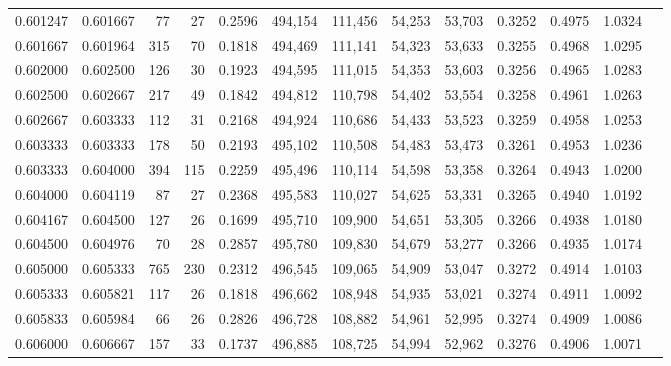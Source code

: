 \begin{tabular}{rrrrrrrrrrrrr}
0.601247 & 0.601667 &    77 &  27 &                                     0.2596 & 494,154 & 111,456 &  54,253 &  53,703 & 0.3252 & 0.4975 & 1.0324 \\
0.601667 & 0.601964 &   315 &  70 &                                     0.1818 & 494,469 & 111,141 &  54,323 &  53,633 & 0.3255 & 0.4968 & 1.0295 \\
0.602000 & 0.602500 &   126 &  30 &                                     0.1923 & 494,595 & 111,015 &  54,353 &  53,603 & 0.3256 & 0.4965 & 1.0283 \\
0.602500 & 0.602667 &   217 &  49 &                                     0.1842 & 494,812 & 110,798 &  54,402 &  53,554 & 0.3258 & 0.4961 & 1.0263 \\
0.602667 & 0.603333 &   112 &  31 &                                     0.2168 & 494,924 & 110,686 &  54,433 &  53,523 & 0.3259 & 0.4958 & 1.0253 \\
0.603333 & 0.603333 &   178 &  50 &                                     0.2193 & 495,102 & 110,508 &  54,483 &  53,473 & 0.3261 & 0.4953 & 1.0236 \\
0.603333 & 0.604000 &   394 & 115 &                                     0.2259 & 495,496 & 110,114 &  54,598 &  53,358 & 0.3264 & 0.4943 & 1.0200 \\
0.604000 & 0.604119 &    87 &  27 &                                     0.2368 & 495,583 & 110,027 &  54,625 &  53,331 & 0.3265 & 0.4940 & 1.0192 \\
0.604167 & 0.604500 &   127 &  26 &                                     0.1699 & 495,710 & 109,900 &  54,651 &  53,305 & 0.3266 & 0.4938 & 1.0180 \\
0.604500 & 0.604976 &    70 &  28 &                                     0.2857 & 495,780 & 109,830 &  54,679 &  53,277 & 0.3266 & 0.4935 & 1.0174 \\
0.605000 & 0.605333 &   765 & 230 &                                     0.2312 & 496,545 & 109,065 &  54,909 &  53,047 & 0.3272 & 0.4914 & 1.0103 \\
0.605333 & 0.605821 &   117 &  26 &                                     0.1818 & 496,662 & 108,948 &  54,935 &  53,021 & 0.3274 & 0.4911 & 1.0092 \\
0.605833 & 0.605984 &    66 &  26 &                                     0.2826 & 496,728 & 108,882 &  54,961 &  52,995 & 0.3274 & 0.4909 & 1.0086 \\
0.606000 & 0.606667 &   157 &  33 &                                     0.1737 & 496,885 & 108,725 &  54,994 &  52,962 & 0.3276 & 0.4906 & 1.0071 \\

\end{tabular}

